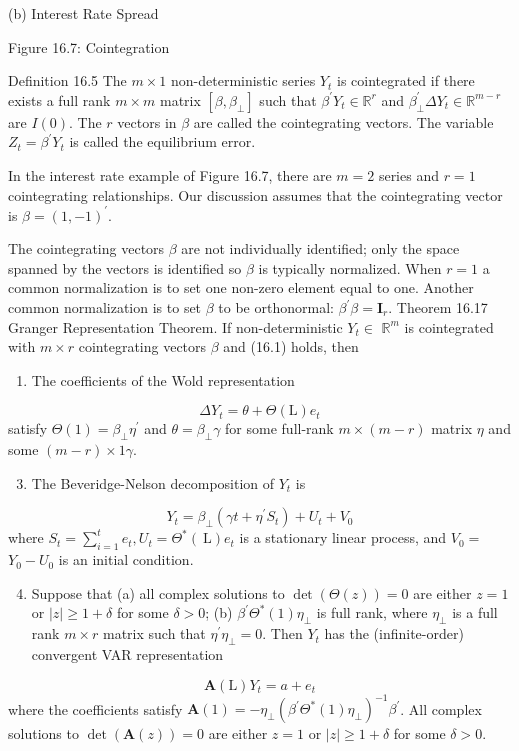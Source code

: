 \documentclass[10pt]{article}
\begin{document}
(b) Interest Rate Spread

Figure 16.7: Cointegration

Definition 16.5 The $m \times 1$ non-deterministic series $Y_{t}$ is cointegrated if there exists a full rank $m \times m$ matrix $\left[\beta, \beta_{\perp}\right]$ such that $\beta^{\prime} Y_{t} \in \mathbb{R}^{r}$ and $\beta_{\perp}^{\prime} \Delta Y_{t} \in \mathbb{R}^{m-r}$ are $I(0)$. The $r$ vectors in $\beta$ are called the cointegrating vectors. The variable $Z_{t}=\beta^{\prime} Y_{t}$ is called the equilibrium error.

In the interest rate example of Figure 16.7, there are $m=2$ series and $r=1$ cointegrating relationships. Our discussion assumes that the cointegrating vector is $\beta=(1,-1)^{\prime}$.

The cointegrating vectors $\beta$ are not individually identified; only the space spanned by the vectors is identified so $\beta$ is typically normalized. When $r=1$ a common normalization is to set one non-zero element equal to one. Another common normalization is to set $\beta$ to be orthonormal: $\beta^{\prime} \beta=\boldsymbol{I}_{r}$. Theorem 16.17 Granger Representation Theorem. If non-deterministic $Y_{t} \in$ $\mathbb{R}^{m}$ is cointegrated with $m \times r$ cointegrating vectors $\beta$ and (16.1) holds, then

\begin{enumerate}
  \item The coefficients of the Wold representation
\end{enumerate}
$$
\Delta Y_{t}=\theta+\Theta(\mathrm{L}) e_{t}
$$
satisfy $\Theta(1)=\beta_{\perp} \eta^{\prime}$ and $\theta=\beta_{\perp} \gamma$ for some full-rank $m \times(m-r)$ matrix $\eta$ and some $(m-r) \times 1 \gamma$.

\begin{enumerate}
  \setcounter{enumi}{2}
  \item The Beveridge-Nelson decomposition of $Y_{t}$ is
\end{enumerate}
$$
Y_{t}=\beta_{\perp}\left(\gamma t+\eta^{\prime} S_{t}\right)+U_{t}+V_{0}
$$
where $S_{t}=\sum_{i=1}^{t} e_{t}, U_{t}=\Theta^{*}(\mathrm{~L}) e_{t}$ is a stationary linear process, and $V_{0}=$ $Y_{0}-U_{0}$ is an initial condition.

\begin{enumerate}
  \setcounter{enumi}{3}
  \item Suppose that (a) all complex solutions to $\operatorname{det}(\Theta(z))=0$ are either $z=1$ or $|z| \geq 1+\delta$ for some $\delta>0$; (b) $\beta^{\prime} \Theta^{*}(1) \eta_{\perp}$ is full rank, where $\eta_{\perp}$ is a full rank $m \times r$ matrix such that $\eta^{\prime} \eta_{\perp}=0$. Then $Y_{t}$ has the (infinite-order) convergent VAR representation
\end{enumerate}
$$
\boldsymbol{A}(\mathrm{L}) Y_{t}=a+e_{t}
$$
where the coefficients satisfy $\boldsymbol{A}(1)=-\eta_{\perp}\left(\beta^{\prime} \Theta^{*}(1) \eta_{\perp}\right)^{-1} \beta^{\prime}$. All complex solutions to $\operatorname{det}(\boldsymbol{A}(z))=0$ are either $z=1$ or $|z| \geq 1+\delta$ for some $\delta>0$.
\end{document}
